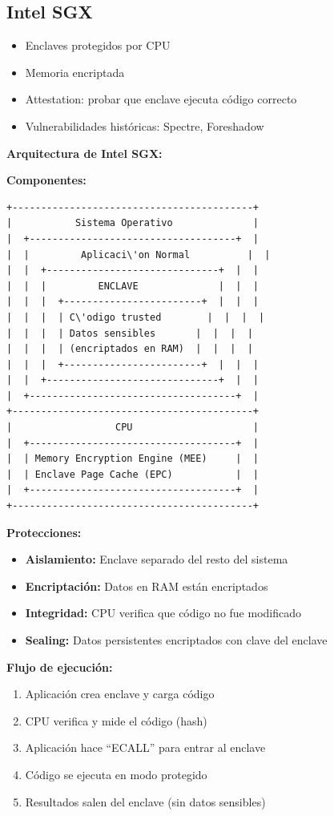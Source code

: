 \documentclass[11pt,a4paper,twoside]{book}
\begin{document}
\subsection{Intel SGX}

\begin{itemize}
    \item Enclaves protegidos por CPU
    \item Memoria encriptada
    \item Attestation: probar que enclave ejecuta c\'odigo correcto
    \item Vulnerabilidades hist\'oricas: Spectre, Foreshadow
\end{itemize}

\begin{mathnote}
\textbf{Arquitectura de Intel SGX:}

\textbf{Componentes:}
\begin{verbatim}
+------------------------------------------+
|           Sistema Operativo              |
|  +------------------------------------+  |
|  |         Aplicaci\'on Normal          |  |
|  |  +------------------------------+  |  |
|  |  |         ENCLAVE              |  |  |
|  |  |  +------------------------+  |  |  |
|  |  |  | C\'odigo trusted        |  |  |  |
|  |  |  | Datos sensibles       |  |  |  |
|  |  |  | (encriptados en RAM)  |  |  |  |
|  |  |  +------------------------+  |  |  |
|  |  +------------------------------+  |  |
|  +------------------------------------+  |
+------------------------------------------+
|                  CPU                     |
|  +------------------------------------+  |
|  | Memory Encryption Engine (MEE)     |  |
|  | Enclave Page Cache (EPC)           |  |
|  +------------------------------------+  |
+------------------------------------------+
\end{verbatim}

\textbf{Protecciones:}
\begin{itemize}
    \item \textbf{Aislamiento:} Enclave separado del resto del sistema
    \item \textbf{Encriptaci\'on:} Datos en RAM est\'an encriptados
    \item \textbf{Integridad:} CPU verifica que c\'odigo no fue modificado
    \item \textbf{Sealing:} Datos persistentes encriptados con clave del enclave
\end{itemize}

\textbf{Flujo de ejecuci\'on:}
\begin{enumerate}
    \item Aplicaci\'on crea enclave y carga c\'odigo
    \item CPU verifica y mide el c\'odigo (hash)
    \item Aplicaci\'on hace ``ECALL'' para entrar al enclave
    \item C\'odigo se ejecuta en modo protegido
    \item Resultados salen del enclave (sin datos sensibles)
\end{enumerate}
\end{mathnote}
\end{document}
